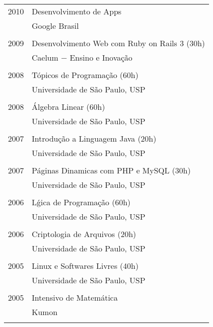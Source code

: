 \documentclass[a4paper, oneside, final]{scrartcl}
\begin{document}
\begin{tabularx}{0.97\linewidth}{p{2cm}X}
2010  & Desenvolvimento de Apps\\
      & Google Brasil\\ \\

2009  & Desenvolvimento Web com Ruby on Rails 3	(30h)\\
      & Caelum $-$ Ensino e Inovação\\ \\

2008  & Tópicos de Programação (60h)\\
      & Universidade de São Paulo, USP\\ \\

2008  & Álgebra Linear (60h)\\
      & Universidade de São Paulo, USP\\ \\

2007  & Introdução a Linguagem Java (20h)\\
      & Universidade de São Paulo, USP\\ \\

2007  & Páginas Dinamicas com PHP e MySQL (30h)\\
      & Universidade de São Paulo, USP\\ \\

2006  & Lǵica de Programação (60h)\\
      & Universidade de São Paulo, USP\\ \\

2006  & Criptologia de Arquivos (20h)\\
      & Universidade de São Paulo, USP\\ \\

2005  & Linux e Softwares Livres (40h)\\
      & Universidade de São Paulo, USP\\ \\

2005  & Intensivo de Matemática\\
      & Kumon\\ \\

\end{tabularx}

%
\end{document}
